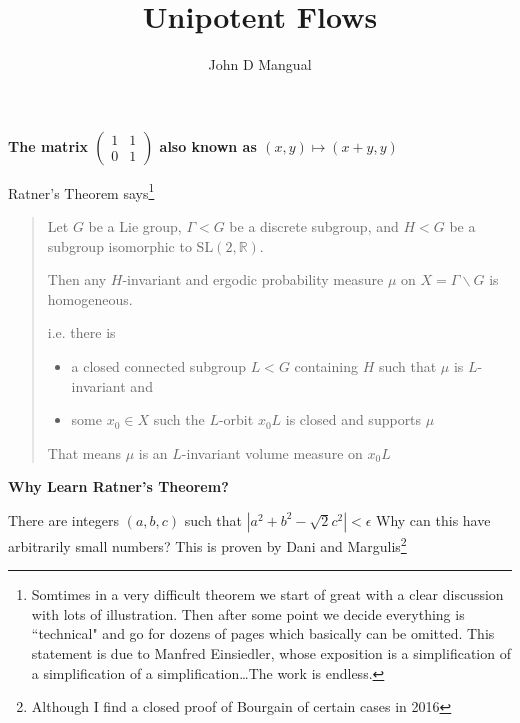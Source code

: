 \documentclass[12pt]{article}
\title{\textbf{ Unipotent Flows }}
\author{John D Mangual}
\date{}
\begin{document}
\selectfont \fontsize{25}{30}\selectfont

\maketitle


\noindent 

\newpage

\noindent \textbf{The matrix $\left(\begin{array}{cc}
1 & 1 \\ 0 & 1 \end{array} \right) $ also known as $(x,y) \mapsto (x+y,y)$} \newline

\noindent Ratner's Theorem says\footnote{Somtimes in a very difficult theorem we start of great with a clear discussion with lots of illustration.  Then after some point we decide everything is ``technical" and go for dozens of pages which basically can be omitted.  This statement is due to Manfred Einsiedler, whose exposition is a simplification of a simplification of a simplification\dots The work is endless.} 

\begin{quotation}
\noindent Let $G$ be a Lie group, $\Gamma < G$ be a discrete subgroup, and $H < G$ be a subgroup isomorphic to $\mathrm{SL}(2, \mathbb{R})$.  \newline

\noindent Then any $H$-invariant and ergodic probability measure $\mu$ on $X = \Gamma \backslash G$ is homogeneous.  \newline

\noindent i.e. there is \begin{itemize}
\item a closed connected subgroup $L < G$ containing $H$ such that $\mu$ is $L$-invariant and 
\item some $x_0 \in X$ such the $L$-orbit $x_0L$ is closed and supports $\mu$
\end{itemize}
That means $\mu$ is an $L$-invariant volume measure on $x_0L$
\end{quotation}

\newpage

\noindent \textbf{Why Learn Ratner's Theorem?} \newline

\noindent There are integers $(a,b,c)$ such that $|a^2 + b^2 - \sqrt{2}c^2 |< \epsilon$ \newline
Why can this have arbitrarily small numbers? This is proven by Dani and Margulis\footnote{ Although I find a closed proof of Bourgain of certain cases in 2016}
\newline
\end{document}
